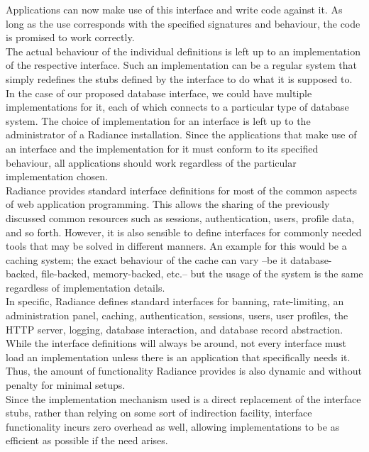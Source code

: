 \documentclass{sig-alternate}
\begin{document}
Applications can now make use of this interface and write code against it. As long as the use corresponds with the specified signatures and behaviour, the code is promised to work correctly. \\

The actual behaviour of the individual definitions is left up to an implementation of the respective interface. Such an implementation can be a regular system that simply redefines the stubs defined by the interface to do what it is supposed to. In the case of our proposed database interface, we could have multiple implementations for it, each of which connects to a particular type of database system. The choice of implementation for an interface is left up to the administrator of a Radiance installation. Since the applications that make use of an interface and the implementation for it must conform to its specified behaviour, all applications should work regardless of the particular implementation chosen. \\

Radiance provides standard interface definitions for most of the common aspects of web application programming. This allows the sharing of the previously discussed common resources such as sessions, authentication, users, profile data, and so forth. However, it is also sensible to define interfaces for commonly needed tools that may be solved in different manners. An example for this would be a caching system; the exact behaviour of the cache can vary --be it database-backed, file-backed, memory-backed, etc.-- but the usage of the system is the same regardless of implementation details. \\

In specific, Radiance defines standard interfaces for banning, rate-limiting, an administration panel, caching, authentication, sessions, users, user profiles, the HTTP server, logging, database interaction, and database record abstraction. While the interface definitions will always be around, not every interface must load an implementation unless there is an application that specifically needs it. Thus, the amount of functionality Radiance provides is also dynamic and without penalty for minimal setups. \\

Since the implementation mechanism used is a direct replacement of the interface stubs, rather than relying on some sort of indirection facility, interface functionality incurs zero overhead as well, allowing implementations to be as efficient as possible if the need arises. \\
\end{document}
